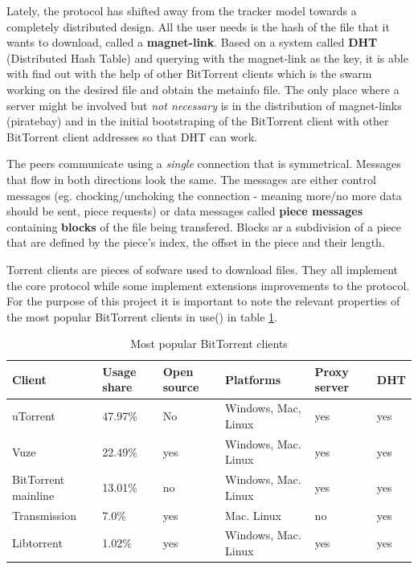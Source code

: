 \documentclass[11pt]{article} %
\begin{document}
Lately, the protocol has shifted away from the tracker model towards a completely distributed design. All the user needs is the hash of the file that it wants to download, called a \textbf{magnet-link}. Based on a system called \textbf{DHT} (Distributed Hash Table) and querying with the magnet-link as the key, it is able with find out with the help of other BitTorrent clients which is the swarm working on the desired file and obtain the metainfo file. The only place where a server might be involved but \textit{not necessary} is in the distribution of magnet-links (piratebay) and in the initial bootstraping of the BitTorrent client with other BitTorrent client addresses so that DHT can work.

The peers communicate using a \textit{single} connection that is symmetrical. Messages that flow in both directions look the same. The messages are either control messages (eg. chocking/unchoking the connection - meaning more/no more data should be sent, piece requests) or data messages called \textbf{piece messages} containing \textbf{blocks} of the file being transfered. Blocks ar a subdivision of a piece that are defined by the piece's index, the offset in the piece and their length.


Torrent clients are pieces of sofware used to download files. They all implement the core protocol while some implement extensions improvements to the protocol.
For the purpose of this project it is important to note the relevant properties of the most popular BitTorrent clients in use(\citep*{btUsage}) in table \ref{btClients}.

\begin{table}
    \begin{tabular}{|l|l|l|l|l|l|}
    \hline
    Client              & Usage share & Open source & Platforms                                   & Proxy server & DHT \\ \hline
    uTorrent            & 47.97\%     & No          & Windows, Mac, Linux  & yes          & yes \\ \hline
    Vuze                & 22.49\%     & yes         & Windows, Mac. Linux                         & yes          & yes \\ \hline
    BitTorrent mainline & 13.01\%     & no          & Windows, Mac. Linux                         & yes          & yes \\ \hline
    Transmission        & 7.0\%       & yes         & Mac. Linux                                  & no           & yes \\ \hline
    Libtorrent          & 1.02\%      & yes         & Windows, Mac. Linux                         & yes          & yes \\ \hline
    \end{tabular}
    \caption {Most popular BitTorrent clients}
    \label {btClients}
\end{table}
\end{document}
